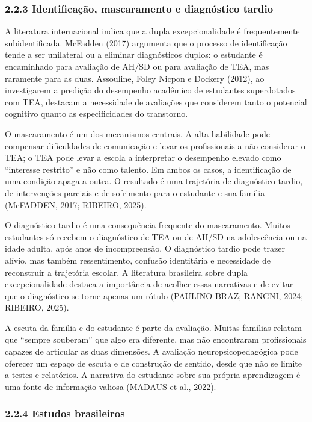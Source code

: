 \subsubsection{2.2.3 Identificação, mascaramento e diagnóstico
tardio}\label{identificauxe7uxe3o-mascaramento-e-diagnuxf3stico-tardio}

A literatura internacional indica que a dupla excepcionalidade é
frequentemente subidentificada. McFadden (2017) argumenta que o processo
de identificação tende a ser unilateral ou a eliminar diagnósticos
duplos: o estudante é encaminhado para avaliação de AH/SD ou para
avaliação de TEA, mas raramente para as duas. Assouline, Foley Nicpon e
Dockery (2012), ao investigarem a predição do desempenho acadêmico de
estudantes superdotados com TEA, destacam a necessidade de avaliações
que considerem tanto o potencial cognitivo quanto as especificidades do
transtorno.

O mascaramento é um dos mecanismos centrais. A alta habilidade pode
compensar dificuldades de comunicação e levar os profissionais a não
considerar o TEA; o TEA pode levar a escola a interpretar o desempenho
elevado como ``interesse restrito'' e não como talento. Em ambos os
casos, a identificação de uma condição apaga a outra. O resultado é uma
trajetória de diagnóstico tardio, de intervenções parciais e de
sofrimento para o estudante e sua família (McFADDEN, 2017; RIBEIRO,
2025).

O diagnóstico tardio é uma consequência frequente do mascaramento.
Muitos estudantes só recebem o diagnóstico de TEA ou de AH/SD na
adolescência ou na idade adulta, após anos de incompreensão. O
diagnóstico tardio pode trazer alívio, mas também ressentimento,
confusão identitária e necessidade de reconstruir a trajetória escolar.
A literatura brasileira sobre dupla excepcionalidade destaca a
importância de acolher essas narrativas e de evitar que o diagnóstico se
torne apenas um rótulo (PAULINO BRAZ; RANGNI, 2024; RIBEIRO, 2025).

A escuta da família e do estudante é parte da avaliação. Muitas famílias
relatam que ``sempre souberam'' que algo era diferente, mas não
encontraram profissionais capazes de articular as duas dimensões. A
avaliação neuropsicopedagógica pode oferecer um espaço de escuta e de
construção de sentido, desde que não se limite a testes e relatórios. A
narrativa do estudante sobre sua própria aprendizagem é uma fonte de
informação valiosa (MADAUS et al., 2022).

\subsubsection{2.2.4 Estudos brasileiros}\label{estudos-brasileiros}

